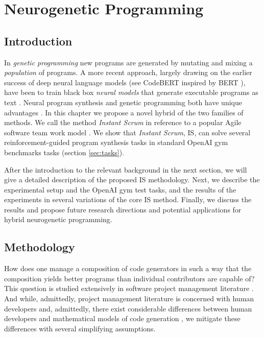 \chapter{Neurogenetic Programming}\label{ch:neurogen}


\section{Introduction}\label{sec:neurogen-intro}

In \emph{genetic programming} \cite{genprog1,genprog2} new programs are generated by mutating and mixing a \emph{population} of programs. 
 A more recent approach, largely drawing on the earlier success of deep neural language models (see CodeBERT \cite{codebert} inspired by BERT \cite{devlinBERTPretrainingDeep2019}), have been to train black box \emph{neural models} that generate executable programs as text \cite{abolafiaNeuralProgramSynthesis2018,deepcoder,structural}. 
 Neural program synthesis and genetic programming both have unique advantages \cite{geneticvsneural}. 
 In this chapter we propose a novel hybrid of the two families of methods. We call the method \emph{Instant Scrum} in reference to a popular Agile software team work model \cite{scrum}. We show that \emph{Instant Scrum}, IS, can solve several reinforcement-guided program synthesis tasks in standard OpenAI gym benchmarks tasks (section \ref{sec:tasks}). 

After the introduction to the relevant background in the next section, we will give a detailed description of the proposed IS methodology. Next, we describe the experimental setup and the OpenAI gym test tasks, and the results of the experiments in several variations of the core IS method. Finally, we discuss the results and propose future research directions and potential applications for hybrid neurogenetic programming. 

\newpage
\section{Methodology}

How does one manage a composition of code generators in such a way that the composition yields better programs than individual contributors are capable of? 
This question is studied extensively in software project management literature \cite{mythicalmanmonth}.
And while, admittedly, project management literature is concerned with human developers and, admittedly, there exist considerable differences between human developers and mathematical models of code generation \cite{bugfixing}, we mitigate these differences with several simplifying assumptions.

